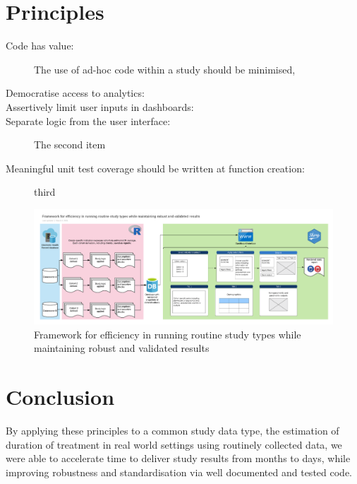 \documentclass{amia}
\begin{document}
\section*{Principles}

\begin{description}
  \item[Code has value:] The use of ad-hoc code within a study should be minimised, 
  \item[Democratise access to analytics:]
  \item[Assertively limit user inputs in dashboards:]
  \item[Separate logic from the user interface:] The second item
  \item[Meaningful unit test coverage should be written at function creation:] third
\end{description}


\begin{figure}[h!]
\centering
\includegraphics[width=\textwidth]{pics/abstract_image.png}
\caption{Framework for efficiency in running routine study types while maintaining robust and validated results}
\label{fig1}
\end{figure}

\section*{Conclusion}
By applying these principles to a common study data type, the estimation of duration of treatment in real world settings using routinely collected data, we were able to accelerate time to deliver study results from months to days, while improving robustness and standardisation via well documented and tested code.
\end{document}
